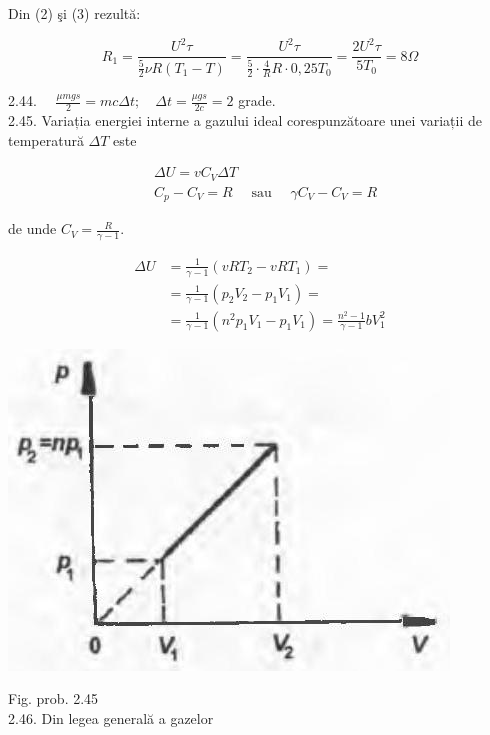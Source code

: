 \documentclass[10pt]{article}
\begin{document}
Din (2) şi (3) rezultă:

$$
R_{1}=\frac{U^{2} \tau}{\frac{5}{2} \nu R\left(T_{1}-T\right)}=\frac{U^{2} \tau}{\frac{5}{2} \cdot \frac{4}{R} R \cdot 0,25 T_{0}}=\frac{2 U^{2} \tau}{5 T_{0}}=8 \Omega
$$

2.44. $\quad \frac{\mu m g s}{2}=m c \Delta t ; \quad \Delta t=\frac{\mu g s}{2 c}=2$ grade.\\
2.45. Variația energiei interne a gazului ideal corespunzătoare unei variații de temperatură $\Delta T$ este

$$
\begin{aligned}
& \Delta U=v C_{V} \Delta T \\
& C_{p}-C_{V}=R \quad \text { sau } \quad \gamma C_{V}-C_{V}=R
\end{aligned}
$$

de unde $C_{V}=\frac{R}{\gamma-1}$.

$$
\begin{aligned}
\Delta U & =\frac{1}{\gamma-1}\left(v R T_{2}-v R T_{1}\right)= \\
& =\frac{1}{\gamma-1}\left(p_{2} V_{2}-p_{1} V_{1}\right)= \\
& =\frac{1}{\gamma-1}\left(n^{2} p_{1} V_{1}-p_{1} V_{1}\right)=\frac{n^{2}-1}{\gamma-1} b V_{1}^{2}
\end{aligned}
$$

\begin{center}
\includegraphics[max width=\textwidth]{2025_07_01_5b3ff9fa0d508c8e9f17g-279}
\end{center}

Fig. prob. 2.45\\
2.46. Din legea generală a gazelor
\end{document}
